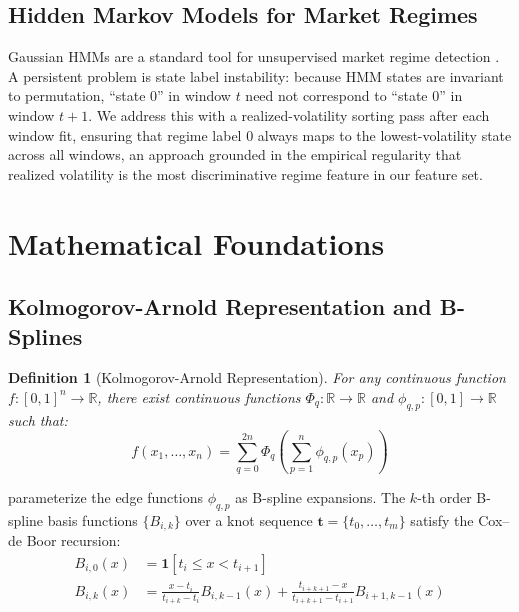 \documentclass[11pt,a4paper]{article}
\newtheorem{definition}{Definition}
\begin{document}
\subsection{Hidden Markov Models for Market Regimes}

Gaussian HMMs are a standard tool for unsupervised market regime detection \citep{hamilton1989new}. A persistent problem is state label instability: because HMM states are invariant to permutation, ``state 0'' in window $t$ need not correspond to ``state 0'' in window $t+1$. We address this with a realized-volatility sorting pass after each window fit, ensuring that regime label 0 always maps to the lowest-volatility state across all windows, an approach grounded in the empirical regularity that realized volatility is the most discriminative regime feature in our feature set.

\section{Mathematical Foundations}
\label{sec:math}

\subsection{Kolmogorov-Arnold Representation and B-Splines}

\begin{definition}[Kolmogorov-Arnold Representation]
For any continuous function $f: [0,1]^n \to \mathbb{R}$, there exist continuous functions $\Phi_q: \mathbb{R} \to \mathbb{R}$ and $\phi_{q,p}: [0,1] \to \mathbb{R}$ such that:
\begin{equation}
f(x_1, \ldots, x_n) = \sum_{q=0}^{2n} \Phi_q \!\left( \sum_{p=1}^{n} \phi_{q,p}(x_p) \right)
\label{eq:ka}
\end{equation}
\end{definition}

\citet{liu_etal_2024_kan} parameterize the edge functions $\phi_{q,p}$ as B-spline expansions. The $k$-th order B-spline basis functions $\{B_{i,k}\}$ over a knot sequence $\mathbf{t} = \{t_0, \ldots, t_{m}\}$ satisfy the Cox--de Boor recursion:
\begin{align}
B_{i,0}(x) &= \mathbf{1}[t_i \leq x < t_{i+1}] \\
B_{i,k}(x) &= \frac{x - t_i}{t_{i+k} - t_i} B_{i,k-1}(x) + \frac{t_{i+k+1} - x}{t_{i+k+1} - t_{i+1}} B_{i+1,k-1}(x)
\label{eq:cox_de_boor}
\end{align}
\end{document}
